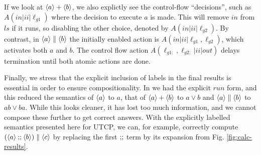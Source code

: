 If we look at $\langle a\rangle + \langle b\rangle$, we also explictly
see the control-flow ``decisions'',
such as $A(in|ii|\ell_{g1})$ where the decision to execute $a$ is made.
This will remove $in$ from $ls$ if it runs,
so disabling the other choice, denoted by $A(in|ii|\ell_{g2})$.
By contrast, in $\langle a\rangle\parallel \langle b\rangle$ the initially enabled
action is $A(in|ii|\ell_{g1},\ell_{g2})$, which activates both $a$ and $b$.
The control flow action $A(\ell_{g1:},\ell_{g2:}|ii|out)$ delays termination
until both atomic actions are done.

Finally,
we stress that the explicit inclusion of labels in the final results
is essential in order to ensure compositionality.
In \cite{conf/tase/BMN16} we had the explicit $run$ form,
and this reduced the semantics of $\langle a\rangle$ to $a$,
that of $\langle a\rangle + \langle b\rangle$ to $a \lor b$
and $\langle a\rangle \parallel \langle b\rangle$ to $ab\lor ba$.
While this looks cleaner, it has lost too much information,
and we cannot compose these further to get correct answers.
With the explicitly labelled semantics presented here for UTCP,
we can, for example, correctly compute $(\langle a\rangle \mathbin{;\!;} \langle b\rangle) \parallel \langle c\rangle$
by replacing the first $\mathbin{;\!;}$ term by its expansion
from Fig. \ref{fig:calc-results}.
